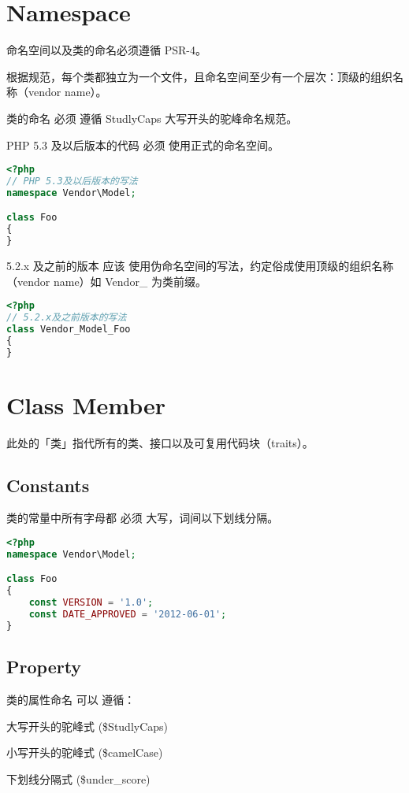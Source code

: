 \section{Namespace}

命名空间以及类的命名必须遵循 PSR-4。

根据规范，每个类都独立为一个文件，且命名空间至少有一个层次：顶级的组织名称（vendor name）。

类的命名 必须 遵循 StudlyCaps 大写开头的驼峰命名规范。

PHP 5.3 及以后版本的代码 必须 使用正式的命名空间。


\begin{lstlisting}[language=PHP]
<?php
// PHP 5.3及以后版本的写法
namespace Vendor\Model;

class Foo
{
}
\end{lstlisting}

5.2.x 及之前的版本 应该 使用伪命名空间的写法，约定俗成使用顶级的组织名称（vendor name）如 Vendor\_ 为类前缀。

\begin{lstlisting}[language=PHP]
<?php
// 5.2.x及之前版本的写法
class Vendor_Model_Foo
{
}
\end{lstlisting}

\section{Class Member}

此处的「类」指代所有的类、接口以及可复用代码块（traits）。

\subsection{Constants}

类的常量中所有字母都 必须 大写，词间以下划线分隔。




\begin{lstlisting}[language=PHP]
<?php
namespace Vendor\Model;

class Foo
{
    const VERSION = '1.0';
    const DATE_APPROVED = '2012-06-01';
}
\end{lstlisting}


\subsection{Property}

类的属性命名 可以 遵循：

\begin{compactitem}
\item 大写开头的驼峰式 (\$StudlyCaps)
\item 小写开头的驼峰式 (\$camelCase)
\item 下划线分隔式 (\$under\_score)
\end{compactitem}

